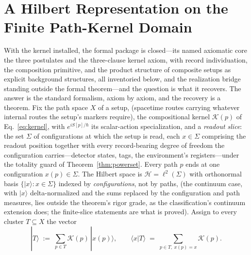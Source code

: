 \section{A Hilbert Representation on the Finite Path-Kernel Domain}\label{sec:recovery}

With the kernel installed, the formal package is closed---its named axiomatic core the three postulates and the three-clause kernel axiom, with record individuation, the composition primitive, and the product structure of composite setups as explicit background structures, all inventoried below, and the realization bridge standing outside the formal theorem---and the question is what it recovers. The answer is the standard formalism, axiom by axiom, and the recovery is a theorem. Fix the path space $X$ of a setup, (spacetime routes carrying whatever internal routes the setup's markers require), the compositional kernel $\mathcal{K}(p)$ of Eq.~\eqref{eq:kernel}, with $e^{iS[p]/\hbar}$ its scalar-action specialization, and a \emph{readout slice}: the set $\Sigma$ of configurations at which the setup is read, each $x \in \Sigma$ comprising the readout position together with every record-bearing degree of freedom the configuration carries---detector states, tags, the environment's registers---under the totality guard of Theorem~\ref{thm:powerset}. Every path $p$ ends at one configuration $x(p) \in \Sigma$. The Hilbert space is $\mathcal{H} = \ell^2(\Sigma)$ with orthonormal basis $\{|x\rangle : x \in \Sigma\}$ indexed by \emph{configurations}, not by paths, (the continuum case, with $|x\rangle$ delta-normalized and the sums replaced by the configuration and path measures, lies outside the theorem's rigor grade, as the classification's continuum extension does; the finite-slice statements are what is proved). Assign to every cluster $T \subseteq X$ the vector
\begin{equation}\label{eq:vector}
|T\rangle \;:=\; \sum_{p \in T} \mathcal{K}(p)\, |x(p)\rangle , \qquad \langle x|T\rangle \;=\; \sum_{p \in T,\; x(p)=x} \mathcal{K}(p) .
\end{equation}
